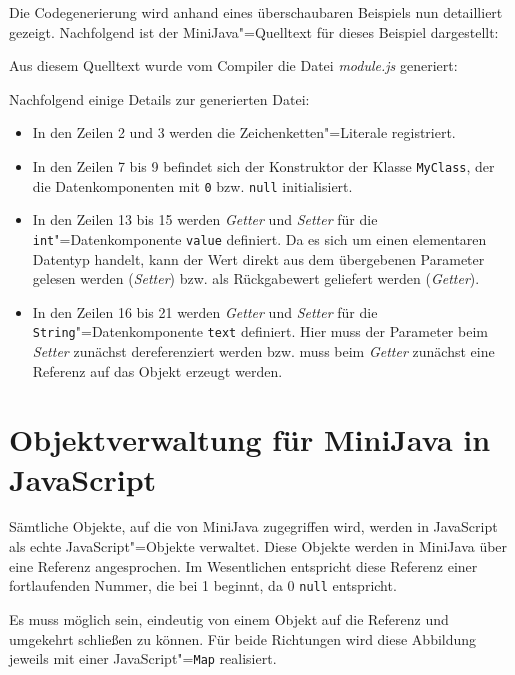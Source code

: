 \pagebreak
Die Codegenerierung wird anhand eines überschaubaren Beispiels nun detailliert gezeigt. Nachfolgend ist der MiniJava"=Quelltext für dieses Beispiel dargestellt:



Aus diesem Quelltext wurde vom Compiler die Datei \emph{module.js} generiert:



Nachfolgend einige Details zur generierten Datei:

\begin{itemize}
    \item In den Zeilen 2 und 3 werden die Zeichenketten"=Literale registriert. 
    \item In den Zeilen 7 bis 9 befindet sich der Konstruktor der Klasse \lstinline{MyClass}, der die Datenkomponenten mit \lstinline{0} bzw. \lstinline{null} initialisiert.
    \item In den Zeilen 13 bis 15 werden \emph{Getter} und \emph{Setter} für die \lstinline{int}"=Datenkomponente \lstinline{value} definiert. Da es sich um einen elementaren Datentyp handelt, kann der Wert direkt aus dem übergebenen Parameter gelesen werden (\emph{Setter}) bzw. als Rückgabewert geliefert werden (\emph{Getter}).
    \item In den Zeilen 16 bis 21 werden \emph{Getter} und \emph{Setter} für die \lstinline{String}"=Datenkomponente \lstinline{text} definiert. Hier muss der Parameter beim \emph{Setter} zunächst dereferenziert werden bzw. muss beim \emph{Getter} zunächst eine Referenz auf das Objekt erzeugt werden.
\end{itemize}

\section{Objektverwaltung für MiniJava in JavaScript}

Sämtliche Objekte, auf die von MiniJava zugegriffen wird, werden in JavaScript als echte JavaScript"=Objekte verwaltet. Diese Objekte werden in MiniJava über eine Referenz angesprochen. Im Wesentlichen entspricht diese Referenz einer fortlaufenden Nummer, die bei 1 beginnt, da 0 \lstinline{null} entspricht.

Es muss möglich sein, eindeutig von einem Objekt auf die Referenz und umgekehrt schließen zu können. Für beide Richtungen wird diese Abbildung jeweils mit einer JavaScript"=\lstinline{Map} realisiert.

